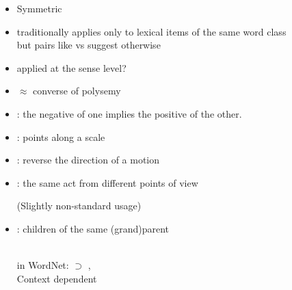 \documentclass[a4paper,landscape,headrule,footrule,xetex]{foils}
\begin{document}

  \begin{itemize}
  \item Symmetric
  \item traditionally applies only to lexical items of the same word class
    \\ but pairs like  vs  suggest otherwise
  \item applied at the sense level?
  \item $\approx$ converse of polysemy
  \end{itemize}





\begin{itemize}
\item {}: the negative of one implies the positive of the other.
  \begin{exe}
    \ex {}
    \ex {}
  \end{exe}
\item {}: points  along a scale
  \begin{exe}
    \ex {}
    \ex {}
  \end{exe}
\item {}: reverse the direction of a motion
  \begin{exe}
    \ex {}
    \ex {}
  \end{exe}
\newpage
\item {}: the same act from different points of view
  \begin{exe}
    \ex {}
    \ex {}
  \end{exe}
  (Slightly non-standard usage)
\item {}: children of the same (grand)parent
  \begin{exe}
    \ex {}
    \\ \textnormal{in WordNet:}  $\supset$ , 
    \ex {}
    \\  \textnormal{Context dependent}
  \end{exe}
\end{itemize}
\end{document}
